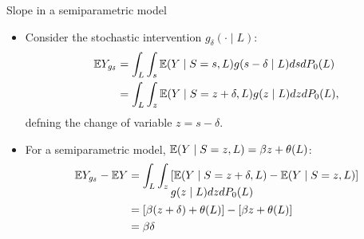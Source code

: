 \documentclass{beamer}
\begin{document}




\begin{frame}[c]{Slope in a semiparametric model}

\begin{center}
\begin{itemize}
  \itemsep8pt
  \item Consider the stochastic intervention $g_{\delta}(\cdot \mid L)$:
    \begin{align*}
      \mathbb{E} Y_{g_{\delta}} &= \int_L \int_s \mathbb{E}(Y \mid S = s, L) g(s - \delta
            \mid L) ds dP_0(L) \\
        &= \int_L \int_z \mathbb{E}(Y \mid S = z + \delta, L) g(z \mid L) dz dP_0(L),
    \end{align*}
      defning the change of variable $z = s - \delta$.
  \item For a semiparametric model, $\mathbb{E} (Y \mid S = z, L) = \beta z +
    \theta(L)$:
    \begin{align*}
      \mathbb{E} Y_{g_{\delta}} - \mathbb{E} Y &= \int_L \int_z
      \begin{aligned}[t]
        & [\mathbb{E}(Y \mid S = z + \delta, L) - \mathbb{E}(Y \mid S = z, L)] \\
        & g(z \mid L) dz dP_0(L)
      \end{aligned} \\
      &= [\beta (z + \delta) + \theta(L)] - [\beta z + \theta(L)] \\
      &= \beta \delta
    \end{align*}
\end{itemize}
\end{center}

\note{
}

\end{frame}
\end{document}

